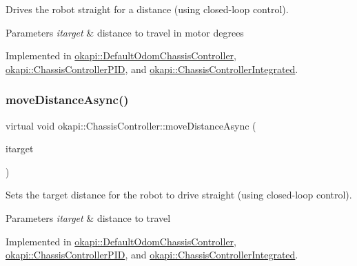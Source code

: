 Drives the robot straight for a distance (using closed-\/loop control).


\begin{DoxyParams}{Parameters}
{\em itarget} & distance to travel in motor degrees \\
\hline
\end{DoxyParams}


Implemented in \mbox{\hyperlink{classokapi_1_1DefaultOdomChassisController_a42abd53b9a0b96b722186ada8eb13d98}{okapi\+::\+Default\+Odom\+Chassis\+Controller}}, \mbox{\hyperlink{classokapi_1_1ChassisControllerPID_a711b80afa09a80233372cc37267606d5}{okapi\+::\+Chassis\+Controller\+P\+ID}}, and \mbox{\hyperlink{classokapi_1_1ChassisControllerIntegrated_ab0361bc7bb5dc0b4ac4c990c1b9dd14f}{okapi\+::\+Chassis\+Controller\+Integrated}}.

\mbox{\label{classokapi_1_1ChassisController_a67a17268b871a4f1ae74d67891cbf5dd}} 
\subsubsection{\texorpdfstring{moveDistanceAsync()}{moveDistanceAsync()}\hspace{0.1cm}{\footnotesize\ttfamily [1/2]}}
{\footnotesize\ttfamily virtual void okapi\+::\+Chassis\+Controller\+::move\+Distance\+Async (\begin{DoxyParamCaption}\item[{Q\+Length}]{itarget }\end{DoxyParamCaption})\hspace{0.3cm}{\ttfamily [pure virtual]}}

Sets the target distance for the robot to drive straight (using closed-\/loop control).


\begin{DoxyParams}{Parameters}
{\em itarget} & distance to travel \\
\hline
\end{DoxyParams}


Implemented in \mbox{\hyperlink{classokapi_1_1DefaultOdomChassisController_a61ca0d303fcbfd08932157af9adbbb12}{okapi\+::\+Default\+Odom\+Chassis\+Controller}}, \mbox{\hyperlink{classokapi_1_1ChassisControllerPID_affad4aa1b0bd54db728ac600493a6c4c}{okapi\+::\+Chassis\+Controller\+P\+ID}}, and \mbox{\hyperlink{classokapi_1_1ChassisControllerIntegrated_afc97bc450a090d91b57bc6353b4a6972}{okapi\+::\+Chassis\+Controller\+Integrated}}.

